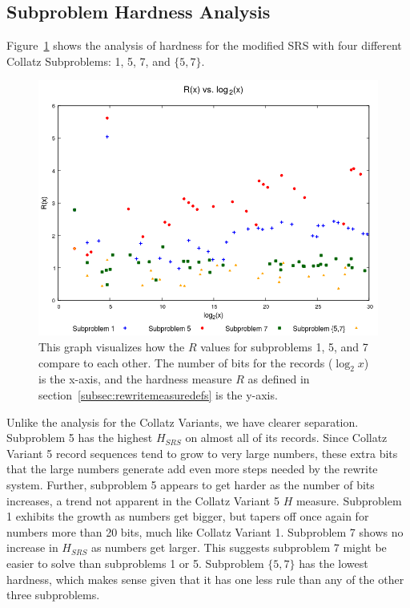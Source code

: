 \subsection{Subproblem Hardness Analysis} \label{subsec:rewritehardness}
Figure~\ref{fig:rvslog} shows the analysis of hardness for the modified SRS with four different Collatz Subproblems: 1, 5, 7, and $\{5,7\}$. 
\begin{figure}
    \centering
    \includegraphics[scale=0.75]{ModAvoidanceAnalysisPics/R_vs_log.png}
    \caption{This graph visualizes how the $R$ values for subproblems 1, 5, and 7 compare to each other. The number of bits for the records ($\log_2{x}$) is the x-axis, and the hardness measure $R$ as defined in section~\ref{subsec:rewritemeasuredefs} is the y-axis.}
    \label{fig:rvslog}
\end{figure}
Unlike the analysis for the Collatz Variants, we have clearer separation. Subproblem 5 has the highest $H_{SRS}$ on almost all of its records. Since Collatz Variant 5 record sequences tend to grow to very large numbers, these extra bits that the large numbers generate add even more steps needed by the rewrite system. Further, subproblem 5 appears to get harder as the number of bits increases, a trend not apparent in the Collatz Variant 5 $H$ measure. Subproblem 1 exhibits the growth as numbers get bigger, but tapers off once again for numbers more than 20 bits, much like Collatz Variant 1. Subproblem 7 shows no increase in $H_{SRS}$ as numbers get larger. This suggests subproblem 7 might be easier to solve than subproblems 1 or 5. Subproblem $\{5,7\}$ has the lowest hardness, which makes sense given that it has one less rule than any of the other three subproblems.
